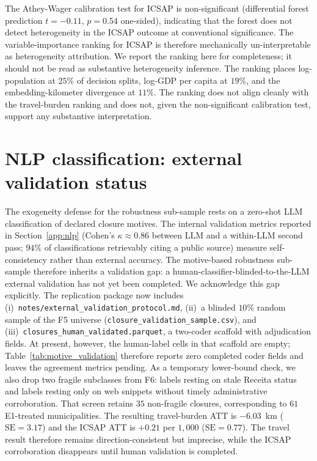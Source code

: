 The Athey-Wager calibration test for ICSAP is non-significant
(differential forest prediction $t = -0.11$, $p = 0.54$ one-sided),
indicating that the forest does not detect heterogeneity in the
ICSAP outcome at conventional significance. The variable-importance
ranking for ICSAP is therefore mechanically un-interpretable as
heterogeneity attribution. We report the ranking here for
completeness; it should not be read as substantive heterogeneity
inference. The ranking places log-population at $25\%$ of decision
splits, log-GDP per capita at $19\%$, and the embedding-kilometer
divergence at $11\%$. The ranking does not align cleanly with the
travel-burden ranking and does not, given the non-significant
calibration test, support any substantive interpretation.

\section{NLP classification: external validation status}
\label{app:nlp-validation}

The exogeneity defense for the robustness sub-sample rests on a zero-shot LLM
classification of declared closure motives. The internal validation
metrics reported in Section~\ref{app:nlp} (Cohen's $\kappa
\approx 0.86$ between LLM and a within-LLM second pass; $94\%$ of
classifications retrievably citing a public source) measure
self-consistency rather than external accuracy. The motive-based
robustness sub-sample therefore inherits a validation gap: a
human-classifier-blinded-to-the-LLM external validation has not yet
been completed. We acknowledge this gap explicitly. The replication
package now includes (i)~\texttt{notes/external\_validation\_protocol.md},
(ii)~a blinded $10\%$ random sample of the F5 universe
(\texttt{closure\_validation\_sample.csv}), and
(iii)~\texttt{closures\_human\_validated.parquet}, a two-coder scaffold
with adjudication fields. At present, however, the human-label cells in
that scaffold are empty; Table~\ref{tab:motive_validation} therefore
reports zero completed coder fields and leaves the agreement metrics
pending. As a
temporary lower-bound check, we also drop two fragile subclasses from
F6: labels resting on stale Receita status and labels resting only on
web snippets without timely administrative corroboration. That screen
retains $35$ non-fragile closures, corresponding to $61$ E1-treated
municipalities. The resulting travel-burden ATT is $-6.03$~km
($\mathrm{SE}=3.17$) and the ICSAP ATT is $+0.21$ per $1{,}000$
($\mathrm{SE}=0.77$). The travel result therefore remains
direction-consistent but imprecise, while the ICSAP corroboration
disappears until human validation is completed.

